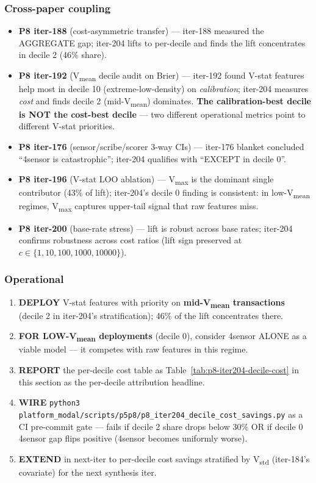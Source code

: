 \subsubsection{Cross-paper coupling}\label{sec:p8-iter204-coupling}

\begin{itemize}
\item \textbf{P8 iter-188} (cost-asymmetric transfer) --- iter-188 measured
  the AGGREGATE gap; iter-204 lifts to per-decile and finds the lift
  concentrates in decile 2 (46\% share).
\item \textbf{P8 iter-192} (V\textsubscript{mean} decile audit on Brier) ---
  iter-192 found V-stat features help most in decile 10 (extreme-low-density)
  on \emph{calibration}; iter-204 measures \emph{cost} and finds decile 2
  (mid-V\textsubscript{mean}) dominates. \textbf{The calibration-best decile
  is NOT the cost-best decile} --- two different operational metrics point
  to different V-stat priorities.
\item \textbf{P8 iter-176} (sensor/scribe/scorer 3-way CIs) --- iter-176
  blanket concluded ``4sensor is catastrophic''; iter-204 qualifies with
  ``EXCEPT in decile 0''.
\item \textbf{P8 iter-196} (V-stat LOO ablation) --- V\textsubscript{max}
  is the dominant single contributor (43\% of lift); iter-204's decile 0
  finding is consistent: in low-V\textsubscript{mean} regimes, V\textsubscript{max}
  captures upper-tail signal that raw features miss.
\item \textbf{P8 iter-200} (base-rate stress) --- lift is robust across
  base rates; iter-204 confirms robustness across cost ratios (lift sign
  preserved at $c \in \{1, 10, 100, 1000, 10000\}$).
\end{itemize}

\subsubsection{Operational}\label{sec:p8-iter204-operational}
\begin{enumerate}
\item \textbf{DEPLOY} V-stat features with priority on \textbf{mid-V\textsubscript{mean}
  transactions} (decile 2 in iter-204's stratification); 46\% of the lift
  concentrates there.
\item \textbf{FOR LOW-V\textsubscript{mean} deployments} (decile 0), consider
  4sensor ALONE as a viable model --- it competes with raw features in
  this regime.
\item \textbf{REPORT} the per-decile cost table as Table~\ref{tab:p8-iter204-decile-cost}
  in this section as the per-decile attribution headline.
\item \textbf{WIRE} \texttt{python3 platform_modal/scripts/p5p8/p8\_iter204\_decile\_cost\_savings.py}
  as a CI pre-commit gate --- fails if decile 2 share drops below 30\% OR
  if decile 0 4sensor gap flips positive (4sensor becomes uniformly worse).
\item \textbf{EXTEND} in next-iter to per-decile cost savings stratified by
  V\textsubscript{std} (iter-184's covariate) for the next synthesis iter.
\end{enumerate}
